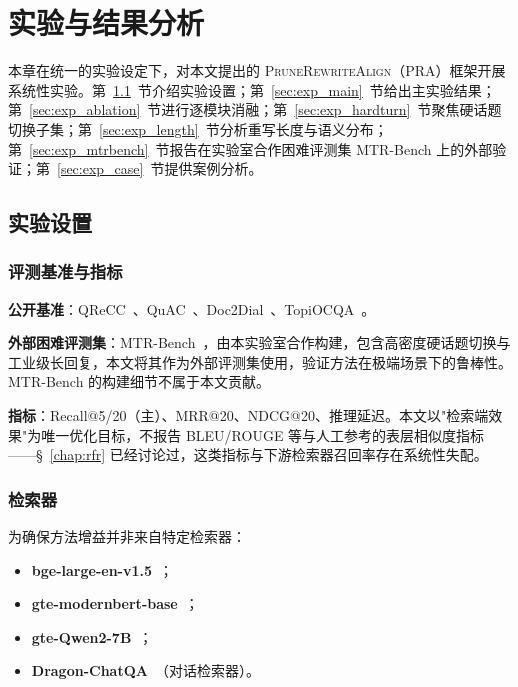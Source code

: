 \chapter{实验与结果分析}
\label{chap:exp}

本章在统一的实验设定下，对本文提出的 \textsc{PruneRewriteAlign}（PRA）框架开展系统性实验。第~\ref{sec:exp_setup}~节介绍实验设置；第~\ref{sec:exp_main}~节给出主实验结果；第~\ref{sec:exp_ablation}~节进行逐模块消融；第~\ref{sec:exp_hardturn}~节聚焦硬话题切换子集；第~\ref{sec:exp_length}~节分析重写长度与语义分布；第~\ref{sec:exp_mtrbench}~节报告在实验室合作困难评测集 MTR-Bench 上的外部验证；第~\ref{sec:exp_case}~节提供案例分析。

\section{实验设置}
\label{sec:exp_setup}

\subsection{评测基准与指标}

\textbf{公开基准}：QReCC~\citep{anantha-etal-2021-qrecc}、QuAC~\citep{choi-etal-2018-quac}、Doc2Dial~\citep{feng-etal-2020-doc2dial}、TopiOCQA~\citep{adlakha-etal-2022-topiocqa}。

\textbf{外部困难评测集}：MTR-Bench~\citep{mtrsuite2025}，由本实验室合作构建，包含高密度硬话题切换与工业级长回复，本文将其作为外部评测集使用，验证方法在极端场景下的鲁棒性。MTR-Bench 的构建细节不属于本文贡献。

\textbf{指标}：Recall@5/20（主）、MRR@20、NDCG@20、推理延迟。本文以"检索端效果"为唯一优化目标，不报告 BLEU/ROUGE 等与人工参考的表层相似度指标——§~\ref{chap:rfr} 已经讨论过，这类指标与下游检索器召回率存在系统性失配。

\subsection{检索器}

为确保方法增益并非来自特定检索器：

\begin{itemize}
    \item \textbf{bge-large-en-v1.5}~\citep{xiao2023cpack}；
    \item \textbf{gte-modernbert-base}~\citep{warner2024modernbert}；
    \item \textbf{gte-Qwen2-7B}~\citep{Zhang2024JasperAS}；
    \item \textbf{Dragon-ChatQA}~\citep{Liu2024ChatQASG}（对话检索器）。
\end{itemize}

